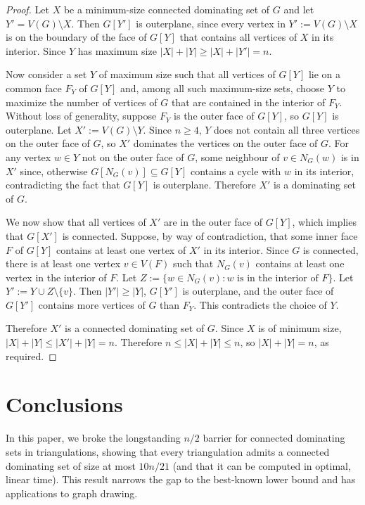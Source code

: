 \documentclass[a4paper,UKenglish, cleveref, autoref, thm-restate]{lipics-v2021}
\begin{document}
\begin{proof}
  Let $X$ be a minimum-size connected dominating set of $G$ and let $Y'=V(G)\setminus X$.  Then $G[Y']$ is outerplane, since every vertex in $Y':=V(G)\setminus X$ is on the boundary of the face of $G[Y]$ that contains all vertices of $X$ in its interior.  Since $Y$ has maximum size $|X|+|Y|\ge |X|+|Y'|= n$.

  Now consider a set $Y$ of maximum size such that all vertices of $G[Y]$ lie on a common face $F_Y$ of $G[Y]$ and, among all such maximum-size sets, choose $Y$ to maximize the number of vertices of $G$ that are contained in the interior of $F_Y$.  Without loss of generality, suppose $F_Y$ is the outer face of $G[Y]$, so $G[Y]$ is outerplane.  Let $X':=V(G)\setminus Y$. Since $n\ge 4$, $Y$ does not contain all three vertices on the outer face of $G$, so $X'$ dominates the vertices on the outer face of $G$. For any vertex $w\in Y$ not on the outer face of $G$, some neighbour of $v\in N_G(w)$ is in $X'$ since, otherwise $G[N_G(v)]\subseteq G[Y]$ contains a cycle with $w$ in its interior, contradicting the fact that $G[Y]$ is outerplane. Therefore $X'$ is a dominating set of $G$.

  We now show that all vertices of $X'$ are in the outer face of $G[Y]$, which implies that $G[X']$ is connected.  Suppose, by way of contradiction, that some inner face $F$ of $G[Y]$ contains at least one vertex of $X'$ in its interior.  Since $G$ is connected, there is at least one vertex $v\in V(F)$ such that $N_G(v)$ contains at least one vertex in the interior of $F$.  Let $Z:=\{w\in N_G(v):\text{$w$ is in the interior of $F$}\}$. Let $Y':=Y\cup Z \setminus\{v\}$.  Then $|Y'|\ge |Y|$, $G[Y']$ is outerplane, and the outer face of $G[Y']$ contains more vertices of $G$ than  $F_Y$. This contradicts the choice of $Y$.

  Therefore $X'$ is a connected dominating set of $G$.  Since $X$ is of minimum size, $|X|+|Y|\le |X'|+|Y|=n$.  Therefore $n\le |X|+|Y|\le n$, so $|X|+|Y|=n$, as required.
\end{proof}

\section{Conclusions}
\label{conclusions}
In this paper, we broke the longstanding $n/2$ barrier for connected dominating sets in triangulations, showing that every triangulation admits a connected dominating set of size at most $10n/21$ (and that it can be computed in optimal, linear time). This result narrows the gap to the best-known lower bound and has applications to graph drawing.
\end{document}
